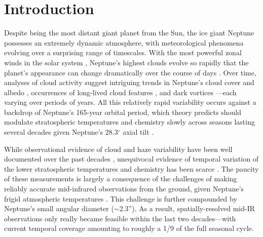 \documentclass[twocolumn,10pt]{aastex631}
\begin{document}


\section{Introduction} \label{sec:intro}

Despite being the most distant giant planet from the Sun, the ice giant Neptune possesses an extremely dynamic atmosphere, with meteorological phenomena evolving over a surprising range of timescales. With the most powerful zonal winds in the solar system \citep{limaye1991winds}, Neptune's highest clouds evolve so rapidly that the planet's appearance can change dramatically over the course of days \citep[\textit{e.g.},][]{smith1989voyager,sromovsky1993dynamics,sromovsky2001neptune}. Over time, analyses of cloud activity suggest intriguing trends in Neptune’s cloud cover and albedo \citep{lockwood2002photometric,lockwood2019final,karkoschka2011neptune}, occurrences of long-lived cloud features \citep{huesoneptunelonglived2017}, and dark vortices \citep{polvani1990simple,lebeau1998epic,stratman2001epic,wong2018new,hsu2019lifetimes,hadland2020epic}---each varying over periods of years.  All this relatively rapid variability occurs against a backdrop of Neptune's 165-year orbital period, which theory predicts should modulate stratospheric temperatures and chemistry slowly across seasons lasting several decades given Neptune's 28.3$^{\circ}$ axial tilt \citep{conrath1990temperature, moses2018seasonal}. 

While observational evidence of cloud and haze variability have been well documented over the past decades \citep[\textit{e.g.},][]{lockwood2002photometric, lockwood2006photometric,lockwood2019final, smith1989voyager,sromovsky2001neptune,sromovsky2003seasonal_response,hammel2007long,karkoschka2011neptune,irwin2011neptune,Roman2013DPS,irwin2016neptunetimevary,huesoneptunelonglived2017,simon2019darkspot,molter2019neptune}, unequivocal evidence of temporal variation of the lower stratospheric temperatures and chemistry has been scarce \citep{roques1994neptune,hammel2006mid, hammel2007long, greathouse2011spatially,fletcher2014neptune, sinclair2020spatial}. The paucity of these measurements is largely a consequence of the challenges of making reliably accurate mid-infrared observations from the ground, given Neptune's frigid atmospheric temperatures \citep{orton1987spectra,conrath1989neptune, fletcher2014neptune}. This challenge is further compounded by Neptune's small angular diameter ($\sim$2.3'').  As a result, spatially-resolved mid-IR observations only really became feasible within the last two decades---with current temporal coverage amounting to roughly a 1/9 of the full seasonal cycle.  
\end{document}
